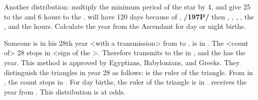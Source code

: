 Another distribution: multiply the minimum period of the star by 4, and give 25 to the \Moon and 6
hours to the \Sun. \Saturn\xspace will have 120 days because of \Capricorn, \textbf{/197P/} then \Mercury\xspace 80, \Venus\xspace 32, \Jupiter\xspace 48, \Mars\xspace 60, the \Moon\xspace 25, and the \Sun\xspace 6 hours. Calculate the year from the Ascendant for day or night births. 

Someone is in his 28th year <with a transmission> from \Libra\xspace to \Capricorn. \Saturn\xspace is in
\Libra. The <count of> 28 stops in \Leo <sign of the \Sun>. Therefore \Saturn\xspace transmits to the \Sun\xspace in \Libra, and the \Sun\xspace has the year. This method is approved by Egyptians, Babylonians, and Greeks. They distinguish the triangles in year 28 as follows: \Venus\xspace is the ruler of the triangle. From \Venus\xspace in \Cancer, the count stops in \Libra. For day births, the ruler of the triangle is \Saturn\xspace in \Libra. \Saturn\xspace receives the year from \Venus. This distribution is at odds.

\newpage
